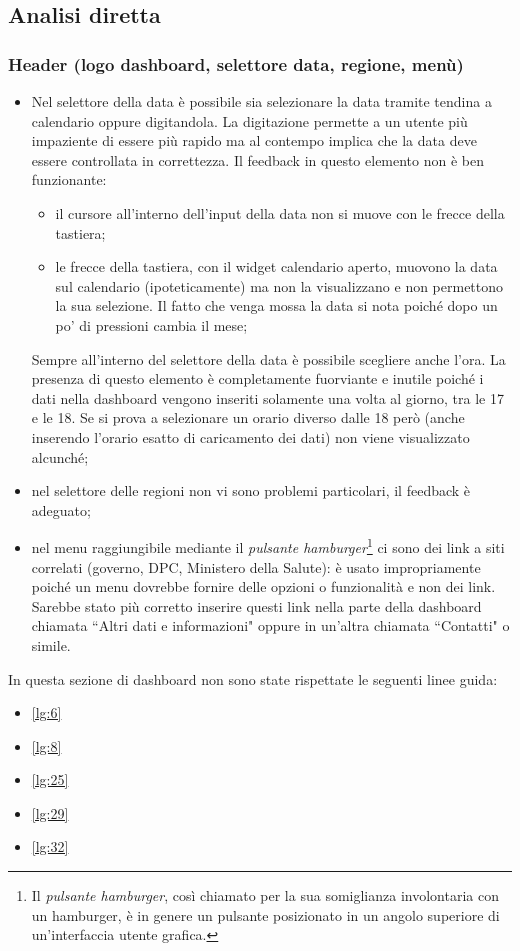 \subsection{Analisi diretta}
\label{ss:analisi-diretta}

\subsubsection{Header (logo dashboard, selettore data, regione, menù)}
\label{sss:header}
\begin{itemize}
    \item Nel selettore della data è possibile sia selezionare la data tramite tendina a calendario oppure digitandola. La digitazione permette a un utente più impaziente di essere più rapido ma al contempo implica che la data deve essere controllata in correttezza. Il feedback in questo elemento non è ben funzionante:
    \begin{itemize}
        \item il cursore all'interno dell'input della data non si muove con le frecce della tastiera;
        \item le frecce della tastiera, con il widget calendario aperto, muovono la data sul calendario (ipoteticamente) ma non la visualizzano e non permettono la sua selezione. Il fatto che venga mossa la data si nota poiché dopo un po' di pressioni cambia il mese;
    \end{itemize}
    Sempre all'interno del selettore della data è possibile scegliere anche l'ora. La presenza di questo elemento è completamente fuorviante e inutile poiché i dati nella dashboard vengono inseriti solamente una volta al giorno, tra le 17 e le 18. Se  si prova a selezionare un orario diverso dalle 18 però (anche inserendo l'orario esatto di caricamento dei dati) non viene visualizzato alcunché;
    \item nel selettore delle regioni non vi sono problemi particolari, il feedback è adeguato;
    \item nel menu raggiungibile mediante il \textit{pulsante hamburger}\footnote{Il \textit{pulsante hamburger}, così chiamato per la sua somiglianza involontaria con un hamburger, è in genere un pulsante posizionato in un angolo superiore di un'interfaccia utente grafica. } ci sono dei link a siti correlati (governo, DPC, Ministero della Salute): è usato impropriamente poiché un menu dovrebbe fornire delle opzioni o funzionalità e non dei link. Sarebbe stato più corretto inserire questi link nella parte della dashboard chiamata ``Altri dati e informazioni" oppure in un'altra chiamata ``Contatti" o simile.
\end{itemize}
In questa sezione di dashboard non sono state rispettate le seguenti linee guida:
\begin{itemize}
    \item \ref{lg:6}
    \item \ref{lg:8}
    \item \ref{lg:25}
    \item \ref{lg:29}
    \item \ref{lg:32}
\end{itemize}

